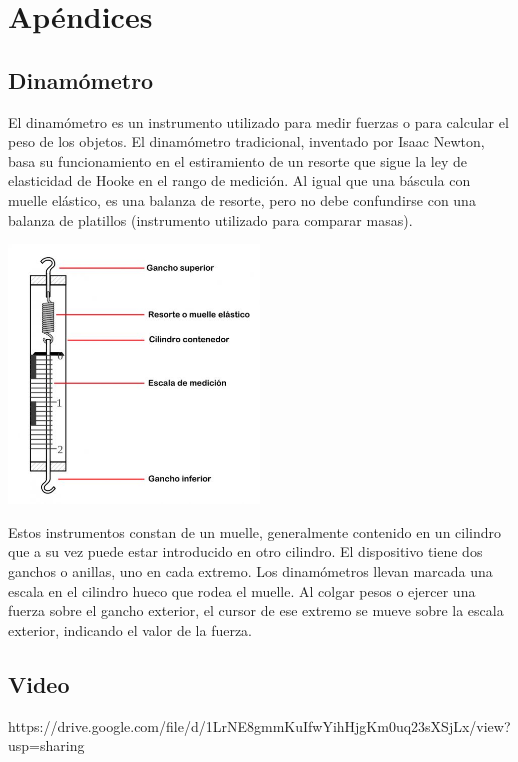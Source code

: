 \documentclass[DIV=calc, paper=a4, fontsize=11pt]{scrartcl}
\newenvironment{Figura}
  {\par\medskip\noindent\minipage{\linewidth}}
  {\endminipage\par\medskip}
\begin{document}
\section*{Apéndices}

\subsection*{Dinamómetro}

El dinamómetro es un instrumento utilizado para medir fuerzas o para calcular el peso de los objetos. El dinamómetro tradicional, inventado por Isaac Newton, basa su funcionamiento en el estiramiento de un resorte que sigue la ley de elasticidad de Hooke en el rango de medición. Al igual que una báscula con muelle elástico, es una balanza de resorte, pero no debe confundirse con una balanza de platillos (instrumento utilizado para comparar masas).

\begin{Figura}
\centering
    \includegraphics[width=0.5\textwidth]{dina_bg.jpg}
    \label{fig}
\end{Figura}

Estos instrumentos constan de un muelle, generalmente contenido en un cilindro que a su vez puede estar introducido en otro cilindro. El dispositivo tiene dos ganchos o anillas, uno en cada extremo. Los dinamómetros llevan marcada una escala en el cilindro hueco que rodea el muelle. Al colgar pesos o ejercer una fuerza sobre el gancho exterior, el cursor de ese extremo se mueve sobre la escala exterior, indicando el valor de la fuerza.

\subsection*{Video}

https://drive.google.com/file/d/1LrNE8gmmKuIfwYihHjgKm0uq23sXSjLx/view?usp=sharing
\end{document}
